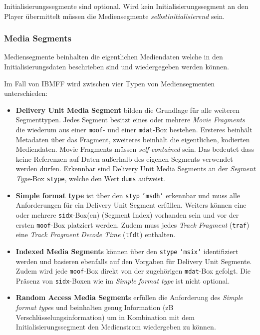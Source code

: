 \documentclass[paper = a4, fontsize = 12pt, parskip = half]{scrartcl} %
\def\attr#1{\texttt{#1}}
\begin{document}
Initialisierungssegmente sind optional. Wird kein Initialisierungssegment an den Player übermittelt müssen die Mediensegmente \textit{selbstinitialisierend} sein.

\subsubsection{Media Segments}
Mediensegmente beinhalten die eigentlichen Mediendaten welche in den Initialisierungsdaten beschrieben sind und wiedergegeben werden können.

Im Fall von IBMFF wird zwischen vier Typen von Mediensegmenten unterschieden:

\begin{itemize}
	\item \textbf{Delivery Unit Media Segment} bilden die Grundlage für alle weiteren Segmenttypen. Jedes Segment besitzt eines oder mehrere \textit{Movie Fragments} die wiederum aus einer \attr{moof}- und einer \attr{mdat}-Box bestehen. Ersteres beinhält Metadaten über das Fragment, zweiteres beinhält die eigentlichen, kodierten Mediendaten. Movie Fragments müssen \textit{self-contained} sein. Das bedeutet dass keine Referenzen auf Daten außerhalb des eigenen Segments verwendet werden dürfen. Erkennbar sind Delivery Unit Media Segments an der \textit{Segment Type}-Box \attr{stype}, welche den Wert \attr{dums} aufweist.
	\item \textbf{Simple format type} ist über den \attr{styp} \attr{'msdh'} erkennbar und muss alle Anforderungen für ein Delivery Unit Segment erfüllen. Weiters können eine oder mehrere \attr{sidx}-Box(en) (Segment Index) vorhanden sein und vor der ersten \attr{moof}-Box platziert werden. Zudem muss jedes \textit{Track Fragment} (\attr{traf}) eine \textit{Track Fragment Decode Time} (\attr{tfdt}) enthalten.
	\item \textbf{Indexed Media Segment}s können über den \attr{stype} \attr{'msix'} identifiziert werden und basieren ebenfalls auf den Vorgaben für Delivery Unit Segmente. Zudem wird jede \attr{moof}-Box direkt von der zugehörigen \attr{mdat}-Box gefolgt. Die Präsenz von \attr{sidx}-Boxen wie im \textit{Simple format type} ist nicht optional.
	\item \textbf{Random Access Media Segment}s erfüllen die Anforderung des \textit{Simple format type}s und beinhalten genug Information (zB Verschlüsselungsinformation) um in Kombination mit dem Initialisierungssegment den Medienstrom wiedergeben zu können.
\end{itemize}
\end{document}

